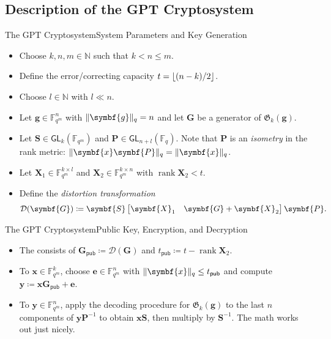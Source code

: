\documentclass[usepdftitle=false]{beamer}
\renewcommand*{\vec}{\symbf}
\newcommand*{\mat}{\symbf}
\DeclareMathOperator{\rank}{rank}
\newcommand*{\GL}{\ensuremath{\mathsf{GL}}}
\newcommand*{\pub}{\ensuremath{\mathsf{pub}}}
\newcommand*{\FF}{\ensuremath{\mathbb{F}}}
\newcommand*{\NN}{\ensuremath{\mathbb{N}}}
\newcommand*{\Gab}{\ensuremath{\mathfrak{G}}}
\DeclarePairedDelimiter{\floor}{\lfloor}{\rfloor}
\DeclarePairedDelimiter{\norm}{\lVert}{\rVert}
\newcommand*{\normR}[2]{\ensuremath{\norm{#1}_{#2}}}
\newcommand*{\Distort}{\mathcal{D}}
\begin{document}
\subsection{Description of the GPT Cryptosystem}

\begin{frame}{The GPT Cryptosystem}{System Parameters and Key Generation}
  \begin{itemize}
  \item Choose \(k, n, m \in \NN\) such that \(k < n \le m\).
  \item Define the error\-/correcting capacity
    \(t = \floor{(n - k) / {2}}\).
  \item Choose \(l \in \NN\) with \(l \ll n\).
  \end{itemize}

  \begin{itemize}
  \item Let \(\vec{g} \in \FF_{q^m}^n\) with
    \(\normR{\vec{g}}{q} = n\) and let \(\mat{G}\) be a generator of
    \(\Gab_k(\vec{g})\).
  \item Let \(\mat{S} \in \GL_k(\FF_{q^m})\) and
    \(\mat{P} \in \GL_{n + l}(\FF_q)\).  Note that \(\mat{P}\) is an
    \emph{isometry} in the rank metric:
    \(\normR{\vec{x} \mat{P}}{q} = \normR{\vec{x}}{q}\).
  \item Let \(\mat{X}_1 \in \FF_{q^m}^{k \times l}\) and
    \(\mat{X}_2 \in \FF_{q^m}^{k \times n}\) with
    \(\rank\mat{X}_2 < t\).
  \item Define the \emph{distortion transformation}
    \[
      \Distort(\mat{G}) \coloneqq
      \mat{S}
      \begin{bmatrix} \mat{X}_1 & \mat{G} + \mat{X}_2 \end{bmatrix}
      \mat{P}\text.
    \]
  \end{itemize}
\end{frame}

\begin{frame}{The GPT Cryptosystem}{Public Key, Encryption, and Decryption}
  \begin{itemize}
  \item The  consists of
    \(\mat{G}_{\pub} \coloneqq \Distort(\mat{G})\) and
    \(t_{\pub} \coloneqq t - \rank\mat{X}_2\).
  \item To  \(\vec{x} \in \FF_{q^m}^k\), choose
    \(\vec{e} \in \FF_{q^m}^n\) with
    \(\normR{\vec{x}}{q} \le t_{\pub}\) and compute
    \(\vec{y} \coloneqq \vec{x} \mat{G}_{\pub} + \vec{e}\).
  \item To  \(\vec{y} \in \FF_{q^m}^n\), apply the
    decoding procedure for \(\Gab_k(\vec{g})\) to the last \(n\)
    components of \(\vec{y} \mat{P}^{-1}\) to obtain
    \(\vec{x} \mat{S}\), then multiply by \(\mat{S}^{-1}\).
    \alert{The math works out just nicely}.
  \end{itemize}
\end{frame}
\end{document}
